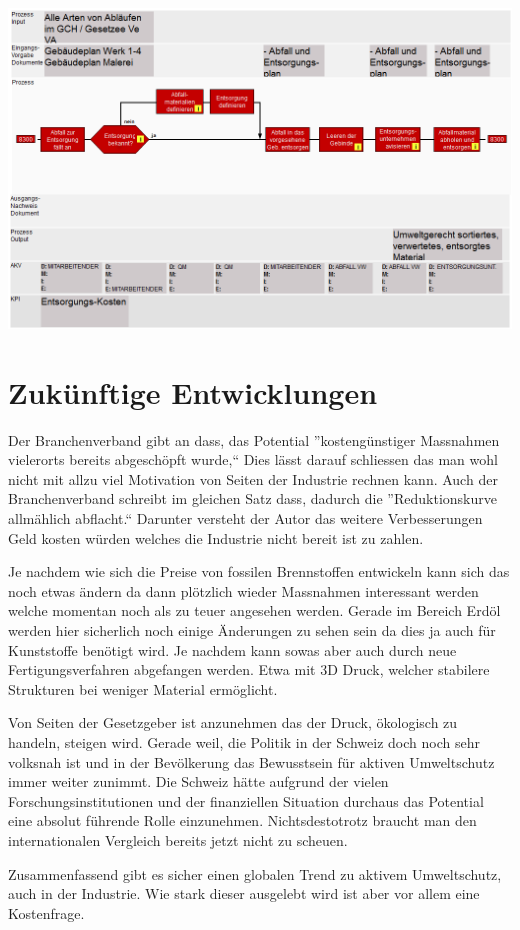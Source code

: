\includegraphics[scale=0.45]{recherche/orgmanager.png}
\newpage

\section{Zukünftige Entwicklungen}
\label{sec:orgd33a30e}
Der Branchenverband gibt an \cite{ref1} dass, das Potential
''kostengünstiger Massnahmen vielerorts bereits abgeschöpft wurde,``
Dies lässt darauf schliessen das man wohl nicht mit allzu viel
Motivation von Seiten der Industrie rechnen kann. Auch der
Branchenverband schreibt im gleichen Satz dass, dadurch die
''Reduktionskurve allmählich abflacht.`` Darunter versteht der Autor
das weitere Verbesserungen Geld kosten würden welches die Industrie
nicht bereit ist zu zahlen.

Je nachdem wie sich die Preise von fossilen Brennstoffen entwickeln
kann sich das noch etwas ändern da dann plötzlich wieder Massnahmen
interessant werden welche momentan noch als zu teuer angesehen
werden. Gerade im Bereich Erdöl werden hier sicherlich noch einige
Änderungen zu sehen sein da dies ja auch für Kunststoffe benötigt wird.
Je nachdem kann sowas aber auch durch neue Fertigungsverfahren
abgefangen werden. Etwa mit 3D Druck, welcher stabilere Strukturen bei
weniger Material ermöglicht.

Von Seiten der Gesetzgeber ist anzunehmen das der Druck, ökologisch zu
handeln, steigen wird. Gerade weil, die Politik in der Schweiz doch
noch sehr volksnah ist und in der Bevölkerung das Bewusstsein für
aktiven Umweltschutz immer weiter zunimmt.  Die Schweiz hätte aufgrund
der vielen Forschungsinstitutionen und der finanziellen Situation
durchaus das Potential eine absolut führende Rolle
einzunehmen. Nichtsdestotrotz braucht man den internationalen
Vergleich bereits jetzt nicht zu scheuen.

Zusammenfassend gibt es sicher einen globalen Trend zu aktivem
Umweltschutz, auch in der Industrie. Wie stark dieser ausgelebt wird
ist aber vor allem eine Kostenfrage.
